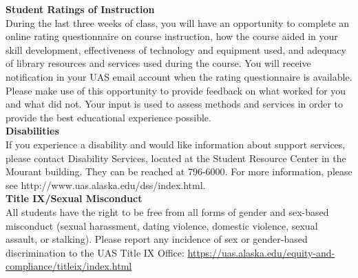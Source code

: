 \documentclass[11pt,letterpaper]{article}
\begin{document}

\textbf{Student Ratings of Instruction}\\
During the last three weeks of class, you will have an opportunity to complete an online rating questionnaire on course instruction, how the course aided in your skill development,  effectiveness of technology and equipment used, and adequacy of library resources and services used during the course. You will receive notification in your UAS email account when the rating questionnaire is available. Please make use of this opportunity to provide feedback on what worked for you and what did not. Your input is used to assess methods and services in order to provide the best educational experience possible.\\

\textbf{Disabilities}\\
If you experience a disability and would like information about support services, please contact Disability Services, located at the Student Resource Center in the Mourant building.  They can be reached at 796-6000. For more information, please see http://www.uas.alaska.edu/dss/index.html.\\

\textbf{Title IX/Sexual Misconduct}\\
All students have the right to be free from all forms of gender and sex-based misconduct (sexual harassment, dating violence, domestic violence, sexual assault, or stalking). Please report any incidence of sex or gender-based discrimination to the UAS Title IX Office: \url{https://uas.alaska.edu/equity-and-compliance/titleix/index.html}

\clearpage
\end{document}
